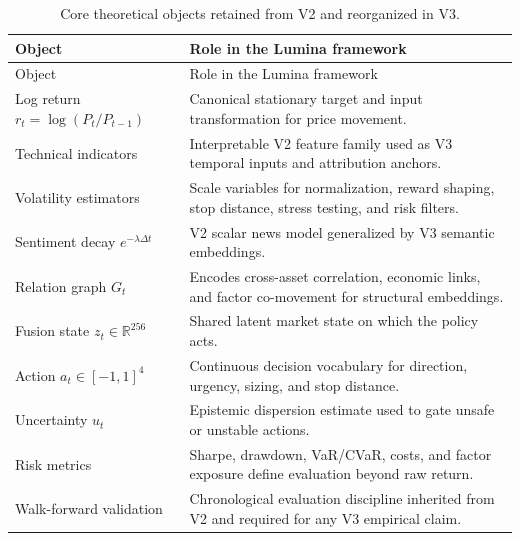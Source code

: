 \documentclass[10pt]{article}
\newcommand{\R}{\mathbb{R}}
\begin{document}
\begin{longtable}{p{}p{}}
	\caption{Core theoretical objects retained from V2 and reorganized in V3.}
	\label{tab:math-summary}                                                                          \\
	\toprule
	Object                                   & Role in the Lumina framework                           \\
	\midrule
	\endfirsthead
	\toprule
	Object                                   & Role in the Lumina framework                           \\
	\midrule
	\endhead
	Log return \(r_t=\log(P_t/P_{t-1})\)     & Canonical stationary target and input
	transformation for price movement.                                                                \\
	Technical indicators                     & Interpretable V2 feature family used as V3 temporal
	inputs and attribution anchors.                                                                   \\
	Volatility estimators                    & Scale variables for normalization, reward shaping,
	stop distance, stress testing, and risk filters.                                                  \\
	Sentiment decay \(e^{-\lambda\Delta t}\) & V2 scalar news model generalized by
	V3 semantic embeddings.                                                                           \\
	Relation graph \(G_t\)                   & Encodes cross-asset correlation, economic links, and
	factor co-movement for structural embeddings.                                                     \\
	Fusion state \(z_t\in\R^{256}\)          & Shared latent market state on which the policy acts.   \\
	Action \(a_t\in[-1,1]^4\)                & Continuous decision vocabulary for direction,
	urgency, sizing, and stop distance.                                                               \\
	Uncertainty \(u_t\)                      & Epistemic dispersion estimate used to gate unsafe or
	unstable actions.                                                                                 \\
	Risk metrics                             & Sharpe, drawdown, VaR/CVaR, costs, and factor exposure
	define evaluation beyond raw return.                                                              \\
	Walk-forward validation                  & Chronological evaluation discipline inherited from V2
	and required for any V3 empirical claim.                                                          \\
	\bottomrule
\end{longtable}
\end{document}
